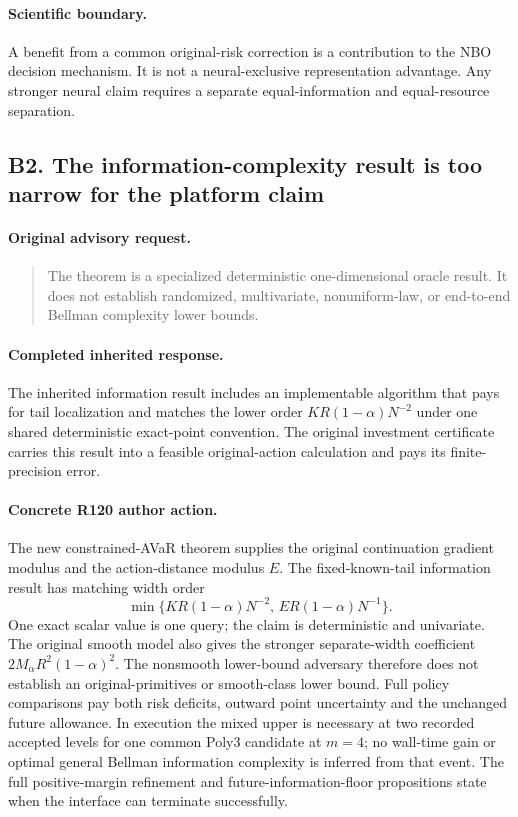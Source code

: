 \paragraph{Scientific boundary.}
A benefit from a common original-risk correction is a contribution to the NBO decision mechanism. It is not a neural-exclusive representation advantage. Any stronger neural claim requires a separate equal-information and equal-resource separation.

\subsection{B2. The information-complexity result is too narrow for the platform claim}
\label{response120:B2}
\paragraph{Original advisory request.}
\begin{quote}
The theorem is a specialized deterministic one-dimensional oracle result. It does not establish randomized, multivariate, nonuniform-law, or end-to-end Bellman complexity lower bounds.
\end{quote}
\paragraph{Completed inherited response.}
The inherited information result includes an implementable algorithm that pays for tail localization and matches the lower order $KR(1-\alpha)N^{-2}$ under one shared deterministic exact-point convention. The original investment certificate carries this result into a feasible original-action calculation and pays its finite-precision error.
\paragraph{Concrete R120 author action.}
The new constrained-AVaR theorem supplies the original continuation gradient modulus and the action-distance modulus $E$. The fixed-known-tail information result has matching width order
\[
 \min\{KR(1-\alpha)N^{-2},\,ER(1-\alpha)N^{-1}\}.
\]
One exact scalar value is one query; the claim is deterministic and univariate. The original smooth model also gives the stronger separate-width coefficient $2M_\alpha R^2(1-\alpha)^2$. The nonsmooth lower-bound adversary therefore does not establish an original-primitives or smooth-class lower bound. Full policy comparisons pay both risk deficits, outward point uncertainty and the unchanged future allowance. In execution the mixed upper is necessary at two recorded accepted levels for one common Poly3 candidate at $m=4$; no wall-time gain or optimal general Bellman information complexity is inferred from that event. The full positive-margin refinement and future-information-floor propositions state when the interface can terminate successfully.

